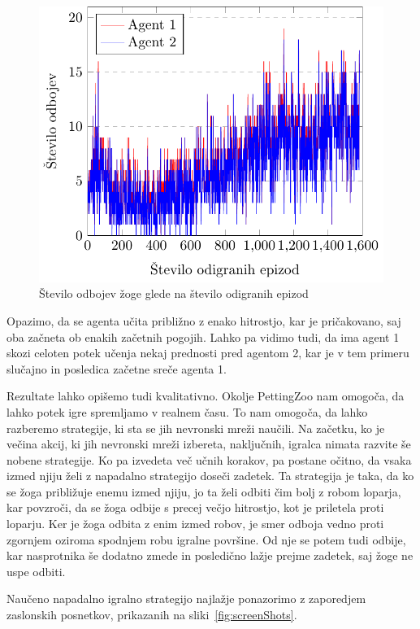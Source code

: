 \documentclass[cover]{thesis}
\begin{document}
\begin{figure}[h]
    \centering
    \includegraphics{fig3.pdf}
    \caption{Število odbojev žoge glede na število odigranih epizod}\label{fig:multiHits}
\end{figure}

Opazimo, da se agenta učita približno z enako hitrostjo, kar je pričakovano, saj oba začneta ob enakih začetnih pogojih. Lahko pa vidimo tudi, da ima agent 1 skozi celoten potek učenja nekaj prednosti pred agentom 2, kar je v tem primeru slučajno in posledica začetne sreče agenta 1. 

Rezultate lahko opišemo tudi kvalitativno. Okolje PettingZoo nam omogoča, da lahko potek igre spremljamo v realnem času. To nam omogoča, da lahko razberemo strategije, ki sta se jih nevronski mreži naučili. Na začetku, ko je večina akcij, ki jih nevronski mreži izbereta, naključnih, igralca nimata razvite še nobene strategije. Ko pa izvedeta več učnih korakov, pa postane očitno, da vsaka izmed njiju želi z napadalno strategijo doseči zadetek. Ta strategija je taka, da ko se žoga približuje enemu izmed njiju, jo ta želi odbiti čim bolj z robom loparja, kar povzroči, da se žoga odbije s precej večjo hitrostjo, kot je priletela proti loparju. Ker je žoga odbita z enim izmed robov, je smer odboja vedno proti zgornjem oziroma spodnjem robu igralne površine. Od nje se potem tudi odbije, kar nasprotnika še dodatno zmede in posledično lažje prejme zadetek, saj žoge ne uspe odbiti.

Naučeno napadalno igralno strategijo najlažje ponazorimo z zaporedjem zaslonskih posnetkov, prikazanih na sliki~\ref{fig:screenShots}.
\end{document}
